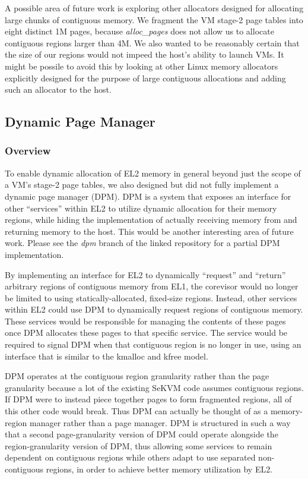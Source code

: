 A possible area of future work is exploring other allocators designed for
allocating large chunks of contiguous memory. We fragment the VM stage-2 page tables
into eight distinct 1M pages, because \textit{alloc\_pages} does not allow us
to allocate contiguous regions larger than 4M. We also wanted to be reasonably certain
that the size of our regions would not impeed the host's ability to launch VMs. It might be possile to avoid this
by looking at other Linux memory allocators explicitly designed for the purpose
of large contiguous allocations and adding such an allocator to the host.

\subsection{Dynamic Page Manager}

\subsubsection{Overview}
To enable dynamic allocation of EL2 memory in general beyond just the scope of
a VM's stage-2 page tables, we also designed but did not fully implement
a dynamic page manager (DPM). DPM is a system that exposes an interface for other ``services'' within EL2 to
utilize dynamic allocation for their memory regions, while hiding the implementation of actually receiving memory from
and returning memory to the host. This would be another interesting area of future work. Please
see the \textit{dpm} branch of the linked repository for a partial DPM implementation.

By implementing an interface for EL2 to dynamically ``request'' and ``return'' arbitrary
regions of contiguous memory from EL1, the corevisor would no longer be limited to using statically-allocated, fixed-size regions.
Instead, other services within EL2 could use DPM to dynamically request regions of contiguous memory.
These services would be responsible for managing the contents of these pages once DPM
allocates these pages to that specific service. The service would be required to signal DPM
when that contiguous region is no longer in use, using an interface that is similar to the kmalloc and kfree model.

DPM operates at the contiguous region granularity rather than the page granularity because
a lot of the existing SeKVM code assumes contiguous regions. If DPM were to instead piece
together pages to form fragmented regions, all of this other code would break. Thus DPM
can actually be thought of as a memory-region manager rather than a page manager. DPM is structured
in such a way that a second page-granularity version of DPM could operate alongside the
region-granularity version of DPM, thus allowing some services to remain dependent on
contiguous regions while others adapt to use separated non-contiguous regions, in order to achieve better memory
utilization by EL2.

